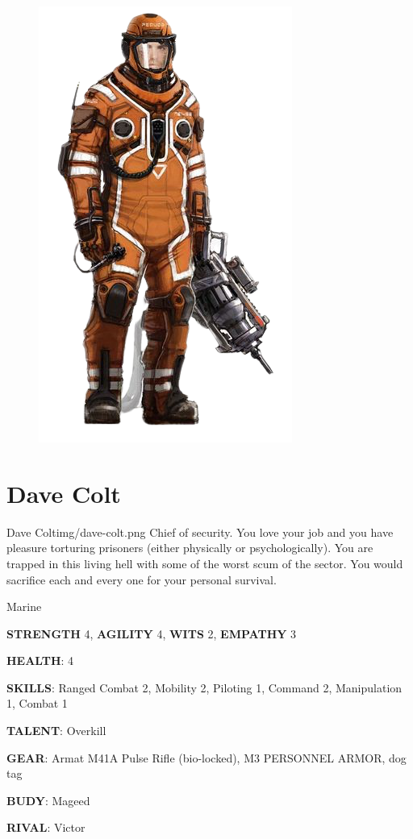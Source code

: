 \begin{figure}
    \centering
    \includegraphics[width=.45\textwidth]{img/bg/firefighter-2.png}
    \label{fig:refinery}
\end{figure}


\clearpage

\section{Dave Colt}

\begin{rpg-pcbox}{Dave Colt}{img/dave-colt.png}
    Chief of security. You love your job and you have pleasure torturing prisoners (either physically or psychologically). You are trapped in this living hell with some of the worst scum of the sector. You would sacrifice each and every one for your personal survival.
\end{rpg-pcbox}

\begin{rpg-commentbox}{}
    Marine

    \textbf{STRENGTH} 4, \textbf{AGILITY} 4, \textbf{WITS} 2, \textbf{EMPATHY} 3

    \textbf{HEALTH}: 4

    \textbf{SKILLS}: Ranged Combat 2, Mobility 2, Piloting 1, Command 2, Manipulation 1, Combat 1
    
    \textbf{TALENT}: Overkill
    
    \textbf{GEAR}: Armat M41A Pulse Rifle (bio-locked), M3 PERSONNEL ARMOR, dog tag

    \textbf{BUDY}: Mageed
    
    \textbf{RIVAL}: Victor
\end{rpg-commentbox}



